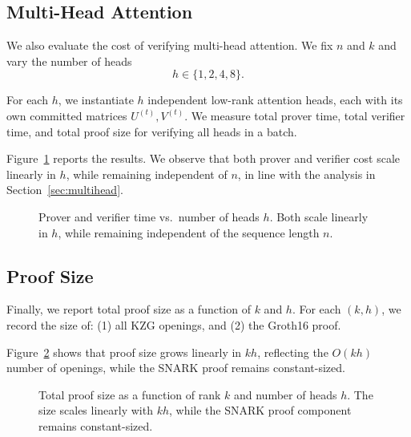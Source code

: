 \documentclass[11pt]{article}
\begin{document}
\subsection{Multi-Head Attention}
\label{subsec:multihead-experiments}

We also evaluate the cost of verifying multi-head attention.
We fix $n$ and $k$ and vary the number of heads
\[
  h \in \{1, 2, 4, 8\}.
\]

For each $h$, we instantiate $h$ independent low-rank attention heads,
each with its own committed matrices $U^{(t)}, V^{(t)}$.
We measure total prover time, total verifier time, and total proof size
for verifying all heads in a batch.

Figure~\ref{fig:multihead} reports the results.
We observe that both prover and verifier cost scale linearly in $h$,
while remaining independent of $n$, in line with the analysis in
Section~\ref{sec:multihead}.

\begin{figure}[t]
  \centering
  \caption{Prover and verifier time vs.\ number of heads $h$.
  Both scale linearly in $h$, while remaining independent of
  the sequence length $n$.}
  \label{fig:multihead}
\end{figure}

\subsection{Proof Size}
\label{subsec:proof-size}

Finally, we report total proof size as a function of $k$ and $h$.
For each $(k, h)$, we record the size of:
(1) all KZG openings, and (2) the Groth16 proof.

Figure~\ref{fig:proof-size} shows that proof size grows linearly in
$k h$, reflecting the $O(kh)$ number of openings, while the SNARK proof
remains constant-sized.

\begin{figure}[t]
  \centering
  \caption{Total proof size as a function of rank $k$ and number of
  heads $h$. The size scales linearly with $kh$, while the SNARK proof
  component remains constant-sized.}
  \label{fig:proof-size}
\end{figure}
\end{document}
